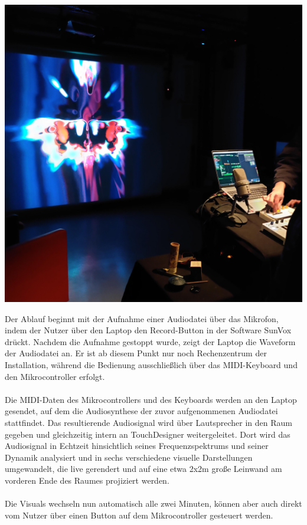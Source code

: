 \documentclass[12pt]{scrartcl}%
\theoremstyle{nonumberplain}
\begin{document}
\begin{center}
 \includegraphics[scale=0.11]{Rauminstallation}
\end{center}

\newpage

\noindent Der Ablauf beginnt mit der Aufnahme einer Audiodatei über das Mikrofon, indem der Nutzer über den Laptop den Record-Button in der Software SunVox drückt. Nachdem die Aufnahme gestoppt wurde, zeigt der Laptop die Waveform der Audiodatei an. Er ist ab diesem Punkt nur noch Rechenzentrum der Installation, während die Bedienung ausschließlich über das MIDI-Keyboard und den Mikrocontroller erfolgt.
\\\\
Die MIDI-Daten des Mikrocontrollers und des Keyboards werden an den Laptop gesendet, auf dem die Audiosynthese der zuvor aufgenommenen Audiodatei stattfindet. Das resultierende Audiosignal wird über Lautsprecher in den Raum gegeben und gleichzeitig intern an TouchDesigner weitergeleitet. Dort wird das Audiosignal in Echtzeit hinsichtlich seines Frequenzspektrums und seiner Dynamik analysiert und in sechs verschiedene visuelle Darstellungen umgewandelt, die live gerendert und auf eine etwa 2x2m große Leinwand am vorderen Ende des Raumes projiziert werden.
\\\\
Die Visuals wechseln nun automatisch alle zwei Minuten, können aber auch direkt vom Nutzer über einen Button auf dem Mikrocontroller gesteuert werden.
\\\\
\end{document}
